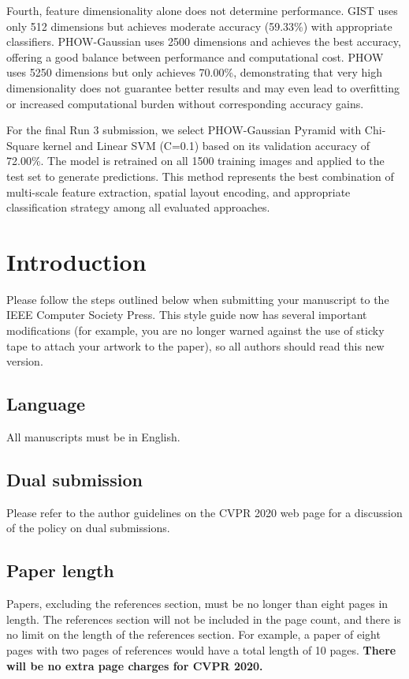 \documentclass[10pt,twocolumn,letterpaper]{article}
\begin{document}
Fourth, feature dimensionality alone does not determine performance. GIST uses only 512 dimensions but achieves moderate accuracy (59.33\%) with appropriate classifiers. PHOW-Gaussian uses 2500 dimensions and achieves the best accuracy, offering a good balance between performance and computational cost. PHOW uses 5250 dimensions but only achieves 70.00\%, demonstrating that very high dimensionality does not guarantee better results and may even lead to overfitting or increased computational burden without corresponding accuracy gains.

For the final Run 3 submission, we select PHOW-Gaussian Pyramid with Chi-Square kernel and Linear SVM (C=0.1) based on its validation accuracy of 72.00\%. The model is retrained on all 1500 training images and applied to the test set to generate predictions. This method represents the best combination of multi-scale feature extraction, spatial layout encoding, and appropriate classification strategy among all evaluated approaches.

\section{Introduction}

Please follow the steps outlined below when submitting your manuscript to
the IEEE Computer Society Press.  This style guide now has several
important modifications (for example, you are no longer warned against the
use of sticky tape to attach your artwork to the paper), so all authors
should read this new version.

\subsection{Language}

All manuscripts must be in English.

\subsection{Dual submission}

Please refer to the author guidelines on the CVPR 2020 web page for a
discussion of the policy on dual submissions.

\subsection{Paper length}
Papers, excluding the references section,
must be no longer than eight pages in length. The references section
will not be included in the page count, and there is no limit on the
length of the references section. For example, a paper of eight pages
with two pages of references would have a total length of 10 pages.
{\bf There will be no extra page charges for CVPR 2020.}
\end{document}
